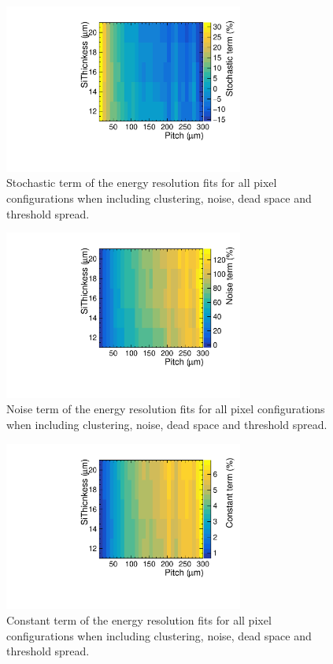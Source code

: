 \begin{figure}
  \centering
  \includegraphics[width=0.7\textwidth,keepaspectratio]{DECALStudies/fig/FullDigiStochastic.pdf}
  \caption{Stochastic term of the energy resolution fits for all pixel configurations when including clustering, noise, dead space and threshold spread.}
  \label{fig:stochastictermDigiClust}
\end{figure}
\begin{figure}
  \centering
  \includegraphics[width=0.7\textwidth,keepaspectratio]{DECALStudies/fig/FullDigiNoise.pdf}
  \caption{Noise term of the energy resolution fits for all pixel configurations when including clustering, noise, dead space and threshold spread.}
  \label{fig:noisetermDigiClust}
\end{figure}
\begin{figure}
  \centering
  \includegraphics[width=0.7\textwidth,keepaspectratio]{DECALStudies/fig/FullDigiConstant.pdf}
  \caption{Constant term of the energy resolution fits for all pixel configurations when including clustering, noise, dead space and threshold spread. }
  \label{fig:constanttermDigiClust}
\end{figure}

